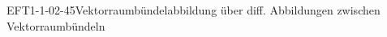 
\begin{DEF}{EFT1-1-02-45}{Vektorraumbündelabbildung über diff. Abbildungen zwischen Vektorraumbündeln}
\end{DEF}
